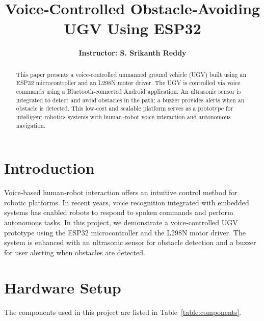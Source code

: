 \documentclass[conference]{IEEEtran}
\begin{document}
\title{Voice‑Controlled Obstacle‑Avoiding UGV Using ESP32}
\author{
      \textbf{Instructor: S. Srikanth Reddy}
}

\maketitle


\begin{abstract}
This paper presents a voice‑controlled unmanned ground vehicle (UGV) built using an ESP32 microcontroller and an L298N motor driver. The UGV is controlled via voice commands using a Bluetooth‑connected Android application. An ultrasonic sensor is integrated to detect and avoid obstacles in the path; a buzzer provides alerts when an obstacle is detected. This low‑cost and scalable platform serves as a prototype for intelligent robotics systems with human–robot voice interaction and autonomous navigation.
\end{abstract}

\section{Introduction}
Voice‑based human‑robot interaction offers an intuitive control method for robotic platforms. In recent years, voice recognition integrated with embedded systems has enabled robots to respond to spoken commands and perform autonomous tasks. In this project, we demonstrate a voice‑controlled UGV prototype using the ESP32 microcontroller and the L298N motor driver. The system is enhanced with an ultrasonic sensor for obstacle detection and a buzzer for user alerting when obstacles are detected.

\section{Hardware Setup}
The components used in this project are listed in Table~\ref{table:components}.
\end{document}
